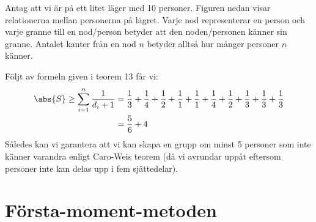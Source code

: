\documentclass[nobib]{tufte-handout}
\begin{document}
\begin{example}
Antag att vi är på ett litet läger med 10 personer. Figuren nedan visar relationerna mellan personerna på lägret. Varje nod representerar en person och varje granne till en nod/person betyder att den noden/personen känner sin granne. Antalet kanter från en nod $n$ betyder alltså hur månger personer $n$ känner. 

     


Följt av formeln given i teorem 13 får vi:
\begin{align*}
    \abs{S} \geq \sum_{i=1}^{n} \frac{1}{d_i + 1} 
    &= \frac{1}{3} + \frac{1}{4} +\frac{1}{2} + \frac{1}{1} + \frac{1}{1} + \frac{1}{4} + \frac{1}{2} + \frac{1}{3} + \frac{1}{3} + \frac{1}{3}\\
    &=\frac{5}{6} + 4\\
\end{align*}
Således kan vi garantera att vi kan skapa en grupp om minst 5 personer som inte känner varandra enligt Caro-Weis teorem (då vi avrundar uppåt eftersom personer inte kan delas upp i fem sjättedelar). 
\end{example}

\section{Första-moment-metoden}
\end{document}
